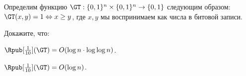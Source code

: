 Определим функцию $\GT: \{0, 1\}^n \times \{0, 1\}^n \to \{0, 1\}$ следующим образом: $\GT(x, y) = 1
\Leftrightarrow x \ge y$, где $x, y$ мы воспринимаем как числа в битовой записи.

Докажите, что:
\begin{enumcyr}
    \item $\Rpub[\frac{1}{10}](\GT) = O(\log n \cdot \log\log n)$.
    \item $\Rpub[\frac{1}{10}](\GT) = O(\log n)$.        
\end{enumcyr}
